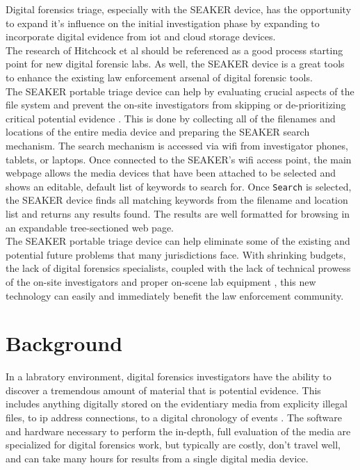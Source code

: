 \documentclass[12pt]{article}
\begin{document}
Digital forensics triage, especially with
the SEAKER device, has the opportunity to expand it's influence on the initial
investigation phase by expanding to incorporate digital evidence from
\gls{iot} and cloud storage devices.\\

The research of Hitchcock et al \cite{hitchcock2016tiered} should be referenced as a good
process starting point for new digital forensic labs.  As well, the SEAKER device is a 
great tools to enhance the existing law enforcement arsenal of digital forensic tools.\\

The SEAKER portable triage device can help by evaluating crucial
aspects of the file system and prevent the on-site investigators from skipping or
de-prioritizing critical potential evidence \cite{rogers2006computer}.  This is done by
collecting all of the filenames and locations of the entire media device and preparing
the SEAKER search mechanism.  The search mechanism is accessed via \gls{wifi} from 
investigator phones, tablets, or laptops.  Once connected to the SEAKER's \gls{wifi}
access point, the main webpage allows the media devices that have been 
attached to be selected and shows an editable, default list of keywords to search
for.  Once \verb|Search| is selected, the SEAKER device finds all matching keywords
from the filename and location list and returns any results found.  The results are
well formatted for browsing in an expandable tree-sectioned web page.\\

The SEAKER portable triage device can help eliminate some of the existing and
potential future problems that many jurisdictions face.  With shrinking budgets,
the lack of digital forensics specialists, coupled with the lack of technical prowess
of the on-site investigators and proper on-scene lab equipment \cite{rogers2006computer},
this new technology can easily and immediately benefit the law enforcement community.\\

\section{Background}
\label{sect-background}

In a labratory environment, digital forensics investigators have the ability to discover
a tremendous amount of material that is potential evidence.  This includes anything 
digitally stored on the evidentiary media from
explicity illegal files, to \gls{ip} address connections, to a digital chronology of
events \cite{raghavan2013digital} \cite{rogers2006computer}.
The software and hardware necessary to perform the
in-depth, full evaluation of the media are specialized for digital forensics 
work, but typically are costly, don't travel well, and can take many hours for
results from a single digital media device.\\
\end{document}
